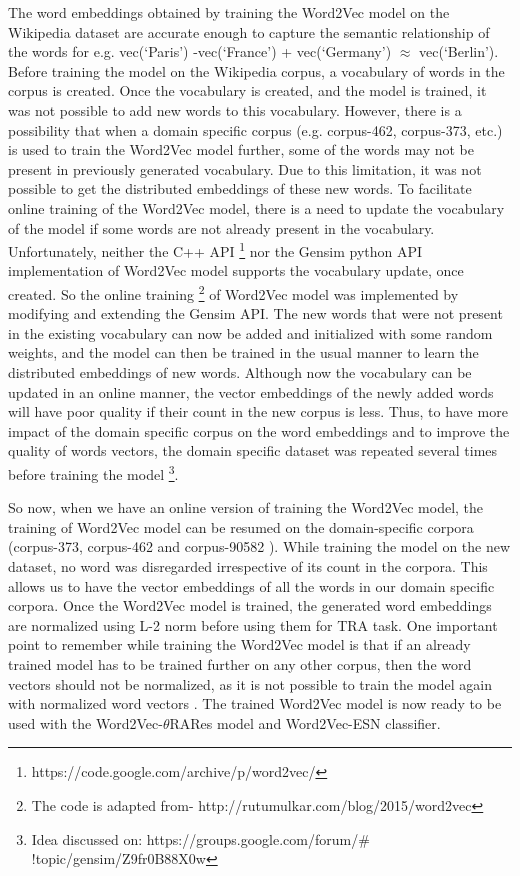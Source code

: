 The word embeddings obtained by training the Word2Vec model on the Wikipedia dataset are accurate enough to capture the semantic relationship of the words for e.g. vec(`Paris') -vec(`France') + vec(`Germany') $\approx$ vec(`Berlin'). Before training the model on the Wikipedia corpus, a vocabulary of words in the corpus is created. Once the vocabulary is created, and the model is trained, it was not possible to add new words to this vocabulary. However, there is a possibility that when a domain specific corpus (e.g. corpus-462, corpus-373, etc.) is used to train the Word2Vec model further, some of the words may not be present in previously generated vocabulary. Due to this limitation, it was not possible to get the distributed embeddings of these new words. To facilitate online training of the Word2Vec model, there is a need to update the vocabulary of the model if some words are not already present in the vocabulary. Unfortunately, neither the C++ API \footnote{https://code.google.com/archive/p/word2vec/} nor the Gensim python API \cite{w2v:gensim_api} implementation of Word2Vec model supports the vocabulary update, once created. So the online training \footnote{The code is adapted from- http://rutumulkar.com/blog/2015/word2vec} of Word2Vec model was implemented by modifying and extending the Gensim API. The new words that were not present in the existing vocabulary can now be added and initialized with some random weights, and the model can then be trained in the usual manner to learn the distributed embeddings of new words. Although now the vocabulary can be updated in an online manner, the vector embeddings of the newly added words will have poor quality if their count in the new corpus is less. Thus, to have more impact of the domain specific corpus on the word embeddings and to improve the quality of words vectors, the domain specific dataset was repeated several times before training the model \footnote{Idea discussed on: https://groups.google.com/forum/$\#$!topic/gensim/Z9fr0B88X0w}.

So now, when we have an online version of training the Word2Vec model, the training of Word2Vec model can be resumed on the domain-specific corpora (corpus-373, corpus-462 and corpus-90582 ). While training the model on the new dataset, no word was disregarded irrespective of its count in the corpora. This allows us to have the vector embeddings of all the words in our domain specific corpora. Once the Word2Vec model is trained, the generated word embeddings are normalized using L-2 norm before using them for TRA task. One important point to remember while training the Word2Vec model is that if an already trained model has to be trained further on any other corpus, then the word vectors should not be normalized, as it is not possible to train the model again with normalized word vectors \cite{w2v:gensim_api}. The trained Word2Vec model is now ready to be used with the Word2Vec-$\theta$RARes model and Word2Vec-ESN classifier.

